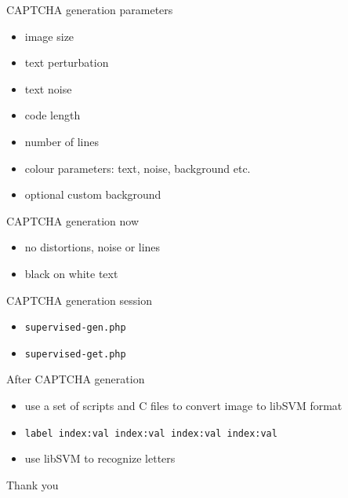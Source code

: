 \documentclass[red]{beamer}
\begin{document}
\begin{frame}{CAPTCHA generation parameters}
  \begin{itemize}
    \item image size
    \item text perturbation
    \item text noise
    \item code length
    \item number of lines
    \item colour parameters: text, noise, background etc.
    \item optional custom background
  \end{itemize}
\end{frame}

\begin{frame}{CAPTCHA generation now}
  \begin{itemize}
    \item no distortions, noise or lines
    \item black on white text
  \end{itemize}
\end{frame}

\begin{frame}{CAPTCHA generation session}
  \begin{itemize}
    \item \texttt{supervised-gen.php}
    \item \texttt{supervised-get.php}
  \end{itemize}
\end{frame}

\begin{frame}{After CAPTCHA generation}
  \begin{itemize}
    \item use a set of scripts and C files to convert image to libSVM format
    \item \texttt{label index:val index:val index:val index:val}
    \item use libSVM to recognize letters
  \end{itemize}
\end{frame}

\begin{frame}{Thank you}
  \begin{center}
  \end{center}
\end{frame}
\end{document}
